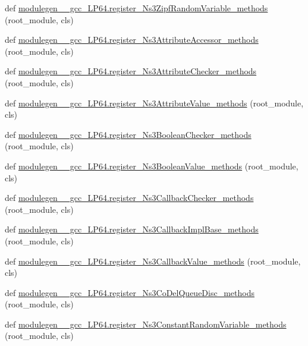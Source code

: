 \begin{DoxyCompactItemize}
\item 
def \hyperlink{namespacemodulegen____gcc__LP64_ac906c1eb78170163bc3e2e3e65f8e43d}{modulegen\+\_\+\+\_\+gcc\+\_\+\+L\+P64.\+register\+\_\+\+Ns3\+Zipf\+Random\+Variable\+\_\+methods} (root\+\_\+module, cls)
\item 
def \hyperlink{namespacemodulegen____gcc__LP64_a88b38d1f62a9078cdbfc0f0d77a01866}{modulegen\+\_\+\+\_\+gcc\+\_\+\+L\+P64.\+register\+\_\+\+Ns3\+Attribute\+Accessor\+\_\+methods} (root\+\_\+module, cls)
\item 
def \hyperlink{namespacemodulegen____gcc__LP64_a7a7d7cb7b6a065a93209b09c08d1c096}{modulegen\+\_\+\+\_\+gcc\+\_\+\+L\+P64.\+register\+\_\+\+Ns3\+Attribute\+Checker\+\_\+methods} (root\+\_\+module, cls)
\item 
def \hyperlink{namespacemodulegen____gcc__LP64_a91d88e3bac410892f68a8f1bfd117d79}{modulegen\+\_\+\+\_\+gcc\+\_\+\+L\+P64.\+register\+\_\+\+Ns3\+Attribute\+Value\+\_\+methods} (root\+\_\+module, cls)
\item 
def \hyperlink{namespacemodulegen____gcc__LP64_aae51853cedcef201fde08823f24cde8f}{modulegen\+\_\+\+\_\+gcc\+\_\+\+L\+P64.\+register\+\_\+\+Ns3\+Boolean\+Checker\+\_\+methods} (root\+\_\+module, cls)
\item 
def \hyperlink{namespacemodulegen____gcc__LP64_a385ab77a8209f9393063c2711e2943eb}{modulegen\+\_\+\+\_\+gcc\+\_\+\+L\+P64.\+register\+\_\+\+Ns3\+Boolean\+Value\+\_\+methods} (root\+\_\+module, cls)
\item 
def \hyperlink{namespacemodulegen____gcc__LP64_a1ef896a5bde844de40d219e98ceb0cee}{modulegen\+\_\+\+\_\+gcc\+\_\+\+L\+P64.\+register\+\_\+\+Ns3\+Callback\+Checker\+\_\+methods} (root\+\_\+module, cls)
\item 
def \hyperlink{namespacemodulegen____gcc__LP64_a27471f48136ec47282f70d414c0f7b6a}{modulegen\+\_\+\+\_\+gcc\+\_\+\+L\+P64.\+register\+\_\+\+Ns3\+Callback\+Impl\+Base\+\_\+methods} (root\+\_\+module, cls)
\item 
def \hyperlink{namespacemodulegen____gcc__LP64_a08b703ec5906729a642f77b58b43c8d8}{modulegen\+\_\+\+\_\+gcc\+\_\+\+L\+P64.\+register\+\_\+\+Ns3\+Callback\+Value\+\_\+methods} (root\+\_\+module, cls)
\item 
def \hyperlink{namespacemodulegen____gcc__LP64_a1247539806d39a0a62e6262b6d7100c1}{modulegen\+\_\+\+\_\+gcc\+\_\+\+L\+P64.\+register\+\_\+\+Ns3\+Co\+Del\+Queue\+Disc\+\_\+methods} (root\+\_\+module, cls)
\item 
def \hyperlink{namespacemodulegen____gcc__LP64_a8d165075e9af75216b2620cd187d2f4e}{modulegen\+\_\+\+\_\+gcc\+\_\+\+L\+P64.\+register\+\_\+\+Ns3\+Constant\+Random\+Variable\+\_\+methods} (root\+\_\+module, cls)

\end{DoxyCompactItemize}
